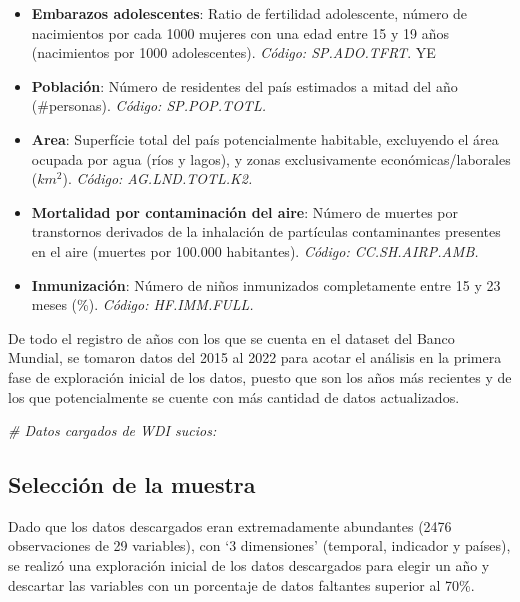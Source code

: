 \documentclass[,article,,moreauthors,pdftex]{Definitions/mdpi}
\newenvironment{Shaded}{\begin{snugshade}}{\end{snugshade}}
\newcommand{\CommentTok}[1]{\textcolor[rgb]{0.56,0.35,0.01}{\textit{#1}}}
\begin{document}
\begin{itemize}
  \textbf{Fertilidad}: Número de niños que daría a luz una mujer si
  viviese hasta el final de sus años fértiles en el momento temporal
  captado (nacimientos por mujer). \emph{Código: SP.DYN.TFRT.IN.}
\item
  \textbf{Embarazos adolescentes}: Ratio de fertilidad adolescente,
  número de nacimientos por cada 1000 mujeres con una edad entre 15 y 19
  años (nacimientos por 1000 adolescentes). \emph{Código: SP.ADO.TFRT}.
  YE
\item
  \textbf{Población}: Número de residentes del país estimados a mitad
  del año (\#personas). \emph{Código: SP.POP.TOTL.}
\item
  \textbf{Area}: Superfície total del país potencialmente habitable,
  excluyendo el área ocupada por agua (ríos y lagos), y zonas
  exclusivamente económicas/laborales (\(km^2\)). \emph{Código:
  AG.LND.TOTL.K2.}
\item
  \textbf{Mortalidad por contaminación del aire}: Número de muertes por
  transtornos derivados de la inhalación de partículas contaminantes
  presentes en el aire (muertes por 100.000 habitantes). \emph{Código:
  CC.SH.AIRP.AMB.}
\item
  \textbf{Inmunización}: Número de niños inmunizados completamente entre
  15 y 23 meses (\%). \emph{Código: HF.IMM.FULL.}
\end{itemize}

De todo el registro de años con los que se cuenta en el dataset del
Banco Mundial, se tomaron datos del 2015 al 2022 para acotar el análisis
en la primera fase de exploración inicial de los datos, puesto que son
los años más recientes y de los que potencialmente se cuente con más
cantidad de datos actualizados.

\begin{Shaded}
\begin{Highlighting}[]
\CommentTok{\# Datos cargados de WDI sucios:}
\end{Highlighting}
\end{Shaded}

\subsection{Selección de la muestra}\label{selecciuxf3n-de-la-muestra}

Dado que los datos descargados eran extremadamente abundantes (2476
observaciones de 29 variables), con `3 dimensiones' (temporal, indicador
y países), se realizó una exploración inicial de los datos descargados
para elegir un año y descartar las variables con un porcentaje de datos
faltantes superior al 70\%.
\end{document}
